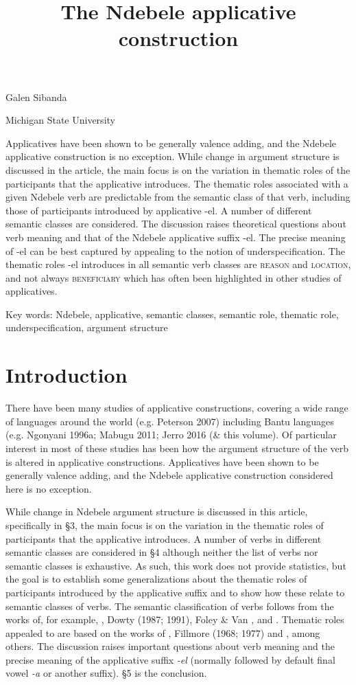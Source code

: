 
\title{The Ndebele applicative construction}

Galen Sibanda

Michigan State University

\begin{stylelsAbstract}
Applicatives have been shown to be generally valence adding, and the Ndebele applicative construction is no exception. While change in argument structure is discussed in the article, the main focus is on the variation in thematic roles of the participants that the applicative introduces. The thematic roles associated with a given Ndebele verb are predictable from the semantic class of that verb, including those of participants introduced by applicative -el. A number of different semantic classes are considered. The discussion raises theoretical questions about verb meaning and that of the Ndebele applicative suffix -el. The precise meaning of -el can be best captured by appealing to the notion of underspecification. The thematic roles -el introduces in all semantic verb classes are \textsc{reason} and \textsc{location}, and not always \textsc{beneficiary} which has often been highlighted in other studies of applicatives. 
\end{stylelsAbstract}

Key words: Ndebele, applicative, semantic classes, semantic role, thematic role,   underspecification, argument structure

\section{ Introduction}

There have been many studies of applicative constructions, covering a wide range of languages around the world (e.g. Peterson 2007) including Bantu languages (e.g. Ngonyani 1996a; Mabugu 2011; Jerro 2016  (\& this volume). Of particular interest in most of these studies has been how the argument structure of the verb is altered in applicative constructions. Applicatives have been shown to be generally valence adding, and the Ndebele applicative construction considered here is no exception. 

  While change in Ndebele argument structure is discussed in this article, specifically in §3, the main focus is on the variation in the thematic roles of participants that the applicative introduces. A number of verbs in different semantic classes are considered in §4 although neither the list of verbs nor semantic classes is exhaustive. As such, this work does not provide statistics, but the goal is to establish some generalizations about the thematic roles of participants introduced by the applicative suffix and to show how these relate to semantic classes of verbs. The semantic classification of verbs follows from the works of, for example, \citet{Chafe1970}, Dowty (1987; 1991), Foley \& Van \citet{Valin1984}, and \citet{Payne1997}. Thematic roles appealed to are based on the works of \citet{Frawley1992}, Fillmore (1968; 1977) and \citet{Halliday1970}, among others. The discussion raises important questions about verb meaning and the precise meaning of the applicative suffix \textit{{}-el }(normally followed by default final vowel \textit{{}-a} or another suffix). §5 is the conclusion.

